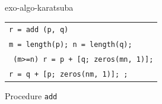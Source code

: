\begin{correction}{exo-algo-karatsuba}
\begin{enumerate}
\begin{listing} \begin{footnotesize} 
{\upshape
\begin{tabular}{l} \texttt{\pfunction r = add (p, q)} \\
\texttt{m = length(p); n = length(q);} \\
\texttt{\pif{} (m>=n) r = p + [q; zeros(mn, 1)];} \\
\texttt{\pelse r = q + [p; zeros(nm, 1)]; \pend{};} \\
\end{tabular}
}
\end{footnotesize}
\caption{Procedure \texttt{\upshape add}}
\label{listing-add}
\end{listing}
\end{enumerate}
\end{correction}

